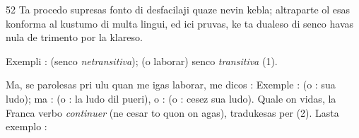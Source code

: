 \begin{VUpage}[56]{52}
Ta procedo supresas fonto di desfacilaji quaze nevin\cc
kebla; altraparte ol esas konforma al kustumo di multa\nl
lingui, ed ici pruvas, ke ta dualeso di senco havas nula de\cc
trimento por la klareso.

Exempli : \nl
{} (senco \textit{netransitiva}); \nl
{} (o laborar) senco\nl
\textit{transitiva} (1).

Ma, se parolesas pri ulu quan me igas laborar, me dicos :\nl
{}\nl
Exemple :  (o : sua ludo); ma : \nl
{} (o : la ludo dil pueri), o : \nl
{} (o : cesez sua ludo). Quale on vidas, la Franca\nl
verbo \textit{continuer} (ne cesar to quon on agas), tradukesas per\nl
{} (2). Lasta exemplo : \nl
{}
\end{VUpage}

